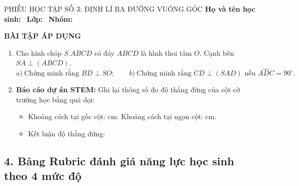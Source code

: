 \documentclass[12pt, a4paper]{article}
\begin{document}
\begin{pedabox}{PHIẾU HỌC TẬP SỐ 3: ĐỊNH LÍ BA ĐƯỜNG VUÔNG GÓC}
\textbf{Họ và tên học sinh:} \dotfill \ \textbf{Lớp:} \dotfill \ \textbf{Nhóm:} \dotfill

\noindent \textbf{BÀI TẬP ÁP DỤNG}
\begin{enumerate}[leftmargin=0.6cm]
    \item Cho hình chóp $S.ABCD$ có đáy $ABCD$ là hình thoi tâm $O$. Cạnh bên $SA \perp (ABCD)$.
    $$a) \ \text{Chứng minh rằng } BD \perp SO; \qquad b) \ \text{Chứng minh rằng } CD \perp (SAD) \text{ nếu } \widehat{ADC} = 90^\circ.$$
    \item \textbf{Báo cáo dự án STEM:} Ghi lại thông số đo độ thẳng đứng của cột cờ trường học bằng quả dọi:
    \begin{itemize}
        \item Khoảng cách tại gốc cột: \dotfill cm. Khoảng cách tại ngọn cột: \dotfill cm.
        \item Kết luận độ thẳng đứng: \dotfill
    \end{itemize}
\end{enumerate}
\end{pedabox}

\subsection*{4. Bảng Rubric đánh giá năng lực học sinh theo 4 mức độ}
\end{document}
